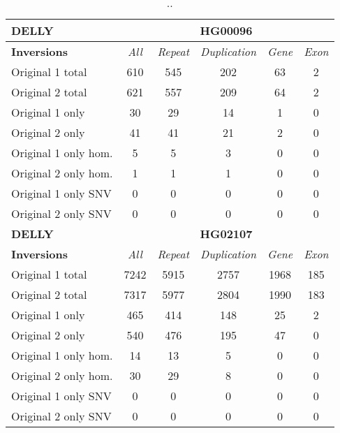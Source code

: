 \begin{table}[htb]
\begin{center}
\begin{tabular}{|l|c||c|c|c|c|}
\hline
{\bf DELLY} & \multicolumn{5}{|c|}{\bf HG00096} \\
\hline
\cline{2-6}
{\bf Inversions} & {\it All} & {\it Repeat} & {\it Duplication} & {\it Gene} & {\it Exon} \\
\hline
Original 1 total & 610 & 545 & 202 & 63 & 2\\ 
\hline
Original 2 total & 621 & 557 & 209 & 64 & 2\\ 
\hline
Original 1 only & 30 & 29 & 14 & 1 & 0\\ 
\hline
Original 2 only & 41 & 41 & 21 & 2 & 0\\ 
\hline
Original 1 only hom. & 5 & 5 & 3 & 0 & 0\\ 
\hline
Original 2 only hom. & 1 & 1 & 1 & 0 & 0\\ 
\hline
Original 1 only SNV & 0 & 0 & 0 & 0 & 0\\ 
\hline
Original 2 only SNV & 0 & 0 & 0 & 0 & 0\\ 
\hline
\hline
{\bf DELLY} & \multicolumn{5}{|c|}{\bf HG02107} \\
\hline
\cline{2-6}
{\bf Inversions} & {\it All} & {\it Repeat} & {\it Duplication} & {\it Gene} & {\it Exon} \\
\hline
Original 1 total & 7242 & 5915 & 2757 & 1968 & 185\\ 
\hline
Original 2 total & 7317 & 5977 & 2804 & 1990 & 183\\ 
\hline
Original 1 only & 465 & 414 & 148 & 25 & 2\\ 
\hline
Original 2 only & 540 & 476 & 195 & 47 & 0\\ 
\hline
Original 1 only hom. & 14 & 13 & 5 & 0 & 0\\ 
\hline
Original 2 only hom. & 30 & 29 & 8 & 0 & 0\\ 
\hline
Original 1 only SNV & 0 & 0 & 0 & 0 & 0\\ 
\hline
Original 2 only SNV & 0 & 0 & 0 & 0 & 0\\ 
\hline
\end{tabular}
\end{center}
\caption{ .. }
\label{tab:orig-vs-shuf-delly-inv}
\end{table}

